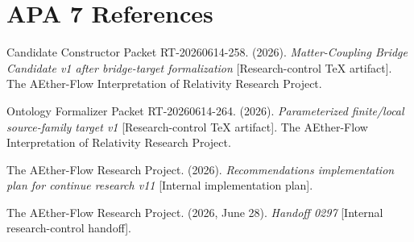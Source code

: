 \documentclass[11pt]{article}
\begin{document}
\section{APA 7 References}

Candidate Constructor Packet RT-20260614-258. (2026). \emph{Matter-Coupling
Bridge Candidate v1 after bridge-target formalization} [Research-control TeX
artifact]. The AEther-Flow Interpretation of Relativity Research Project.

Ontology Formalizer Packet RT-20260614-264. (2026). \emph{Parameterized
finite/local source-family target v1} [Research-control TeX artifact]. The
AEther-Flow Interpretation of Relativity Research Project.

The AEther-Flow Research Project. (2026). \emph{Recommendations implementation
plan for continue research v11} [Internal implementation plan].

The AEther-Flow Research Project. (2026, June 28). \emph{Handoff 0297}
[Internal research-control handoff].
\end{document}
